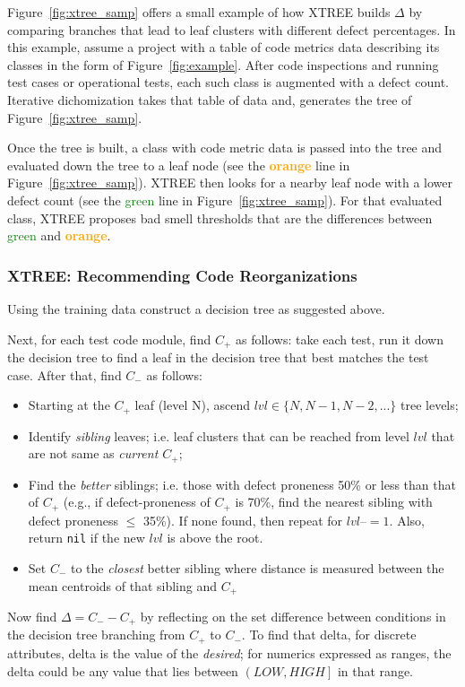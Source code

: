 \documentclass[twocolumn,5p]{elsarticle}
\newcommand{\fig}[1]{Figure~\ref{fig:#1}}
\theoremstyle{break}
\begin{document}
	\fig{xtree_samp} offers
	a small example of how XTREE builds
	$\Delta$ by comparing branches that lead to leaf clusters
	with different defect percentages. In this example, assume a project with 
	a 
	table of code metrics data describing its classes in the form of 
	\fig{example}. 
	After code inspections and running test cases or operational
	tests, each such class is augmented with a defect count.
	Iterative dichomization takes that table of data and,
	generates the tree of \fig{xtree_samp}.
	
	Once the tree is built, a class with code metric data is passed into the 
	tree and evaluated down the tree to a leaf node (see the 
	\textcolor{orange}{{\bf orange}} line in \fig{xtree_samp}).
	XTREE then looks for a nearby leaf node with a lower defect
	count (see the \textcolor{green}{{green}} line in \fig{xtree_samp}). For 
	that evaluated class, XTREE proposes bad smell
	thresholds that are the differences between
	\textcolor{green}{{green}} and \textcolor{orange}{{\bf orange}}.
	
	
	\subsubsection{XTREE: Recommending Code Reorganizations}
	
	Using the training data construct a decision tree as suggested above.
	
	Next, for each test code module,
	find $C_+$ as follows: take each test, run it down the decision tree to 
	find a leaf in the decision tree that best matches the test case.
	After that,	find $C_-$ as follows:
	\begin{itemize}
		\item Starting at the  $C_+$ leaf (level N), ascend $lvl\in 
		\{N,N-1,N-2, 
		...\}$ tree 
		levels;
		\item Identify {\em sibling} leaves; i.e. leaf clusters that can be 
		reached from level $lvl$ that are not same as {\em current $C_+$};
		\item Find the {\em better} siblings; i.e. those with defect proneness 
		50\% or less than that of $C_+$ (e.g., if defect-proneness of $C_+$ is 
		70\%, find the nearest sibling with defect proneness $\leq$ 35\%). If 
		none found, then repeat for $lvl$--$=1$. Also, return \texttt{nil} if 
		the new $lvl$ is above the root.
		\item  Set $C_-$ to the  {\em closest} better sibling where distance is 
		measured between the mean centroids of that sibling and {\em $C_+$}
	\end{itemize}
	Now find $\Delta = C_- - C_+$  by reflecting
	on the set difference between  conditions in the decision tree branching 
	from $C_+$ to $C_-$. To find that delta,
	for discrete attributes, delta is the value of the {\em desired}; for 
	numerics  expressed as ranges, the delta could be any value that lies 
	between $\left( LOW, HIGH\right]$ in that range.
	
\end{document}
